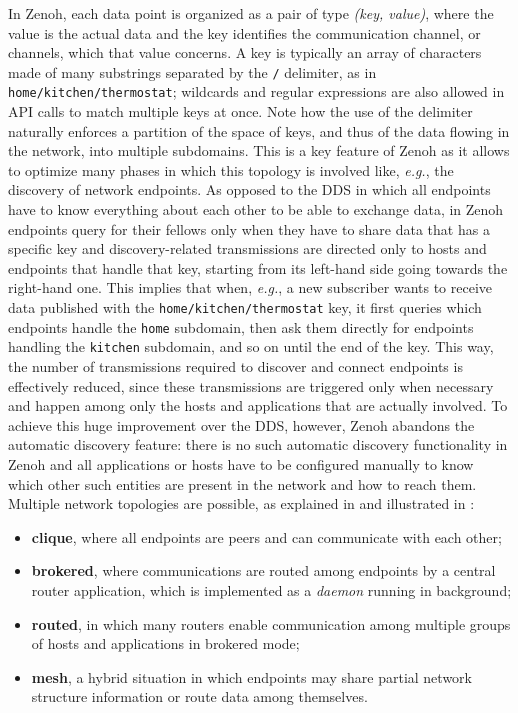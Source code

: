 In Zenoh, each data point is organized as a pair of type \emph{(key, value)}, where the value is the actual data and the key identifies the communication channel, or channels, which that value concerns. A key is typically an array of characters made of many substrings separated by the \texttt{/} delimiter, as in \texttt{home/kitchen/thermostat}; wildcards and regular expressions are also allowed in API calls to match multiple keys at once. Note how the use of the delimiter naturally enforces a partition of the space of keys, and thus of the data flowing in the network, into multiple subdomains. This is a key feature of Zenoh as it allows to optimize many phases in which this topology is involved like, \emph{e.g.}, the discovery of network endpoints. As opposed to the DDS in which all endpoints have to know everything about each other to be able to exchange data, in Zenoh endpoints query for their fellows only when they have to share data that has a specific key and discovery-related transmissions are directed only to hosts and endpoints that handle that key, starting from its left-hand side going towards the right-hand one. This implies that when, \emph{e.g.}, a new subscriber wants to receive data published with the \texttt{home/kitchen/thermostat} key, it first queries which endpoints handle the \texttt{home} subdomain, then ask them directly for endpoints handling the \texttt{kitchen} subdomain, and so on until the end of the key. This way, the number of transmissions required to discover and connect endpoints is effectively reduced, since these transmissions are triggered only when necessary and happen among only the hosts and applications that are actually involved. To achieve this huge improvement over the DDS, however, Zenoh abandons the automatic discovery feature: there is no such automatic discovery functionality in Zenoh and all applications or hosts have to be configured manually to know which other such entities are present in the network and how to reach them. Multiple network topologies are possible, as explained in \cite{corsaro_zenoh_2023} and illustrated in :
\begin{itemize}
  \item \textbf{clique}, where all endpoints are peers and can communicate with each other;
  \item \textbf{brokered}, where communications are routed among endpoints by a central router application, which is implemented as a \emph{daemon} running in background;
  \item \textbf{routed}, in which many routers enable communication among multiple groups of hosts and applications in brokered mode;
  \item \textbf{mesh}, a hybrid situation in which endpoints may share partial network structure information or route data among themselves.
\end{itemize}
